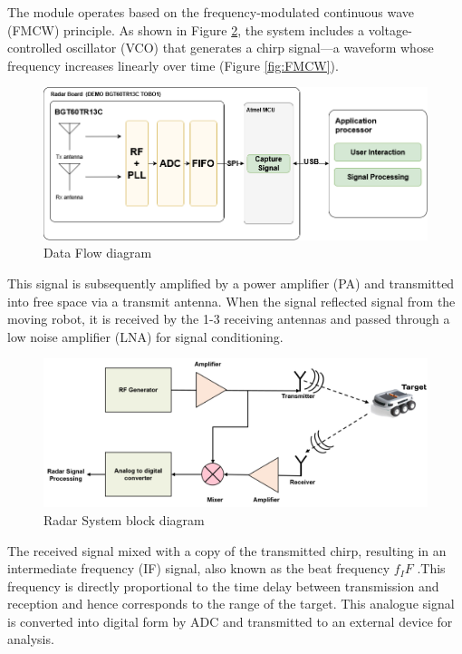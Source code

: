 The module operates based on the frequency-modulated continuous wave (FMCW) principle. As shown in Figure \ref{fig:Radar System block diagram}, the system includes a voltage-controlled oscillator (VCO) that generates a chirp signal—a waveform whose frequency increases linearly over time (Figure \ref{fig:FMCW}). 


\begin{figure}[H]
    \centering
    \includegraphics[width=0.7\linewidth]{Src/images/radar board.drawio(1).png}
    \caption{Data Flow diagram}
    \label{fig:Data Flow diagram}
\end{figure}



This signal is subsequently amplified by a power amplifier (PA) and transmitted into free space via a transmit antenna. When the signal reflected signal from the moving robot, it is received by the 1-3 receiving antennas and passed through a low noise amplifier (LNA) for signal conditioning.

\begin{figure}[H]
    \centering
    \includegraphics[width=0.9\linewidth]{Src/images/img_typical_radar_system.png}
    \caption{Radar System block diagram}
    \label{fig:Radar System block diagram}
\end{figure}

 The received signal mixed with a copy of the transmitted chirp, resulting in an intermediate frequency (IF) signal, also known as the beat frequency $f_IF$ .This frequency is directly proportional to the time delay between transmission and reception and hence corresponds to the range of the target.
This analogue signal is converted into digital form by ADC and transmitted to an external device for analysis. 

